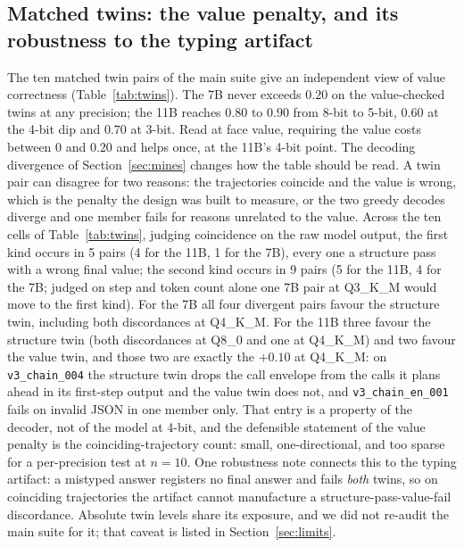 \documentclass[11pt]{article}
\begin{document}
\subsection{Matched twins: the value penalty, and its robustness to the typing artifact}
\label{sec:twins-results}
The ten matched twin pairs of the main suite give an independent view of value correctness (Table~\ref{tab:twins}). The 7B never exceeds $0.20$ on the value-checked twins at any precision; the 11B reaches $0.80$ to $0.90$ from 8-bit to 5-bit, $0.60$ at the 4-bit dip and $0.70$ at 3-bit. Read at face value, requiring the value costs between $0$ and $0.20$ and helps once, at the 11B's 4-bit point. The decoding divergence of Section~\ref{sec:mines} changes how the table should be read. A twin pair can disagree for two reasons: the trajectories coincide and the value is wrong, which is the penalty the design was built to measure, or the two greedy decodes diverge and one member fails for reasons unrelated to the value. Across the ten cells of Table~\ref{tab:twins}, judging coincidence on the raw model output, the first kind occurs in 5 pairs (4 for the 11B, 1 for the 7B), every one a structure pass with a wrong final value; the second kind occurs in 9 pairs (5 for the 11B, 4 for the 7B; judged on step and token count alone one 7B pair at Q3\_K\_M would move to the first kind). For the 7B all four divergent pairs favour the structure twin, including both discordances at Q4\_K\_M. For the 11B three favour the structure twin (both discordances at Q8\_0 and one at Q4\_K\_M) and two favour the value twin, and those two are exactly the $+0.10$ at Q4\_K\_M: on \texttt{v3\_chain\_004} the structure twin drops the call envelope from the calls it plans ahead in its first-step output and the value twin does not, and \texttt{v3\_chain\_en\_001} fails on invalid JSON in one member only. That entry is a property of the decoder, not of the model at 4-bit, and the defensible statement of the value penalty is the coinciding-trajectory count: small, one-directional, and too sparse for a per-precision test at $n=10$. One robustness note connects this to the typing artifact: a mistyped answer registers no final answer and fails \emph{both} twins, so on coinciding trajectories the artifact cannot manufacture a structure-pass-value-fail discordance. Absolute twin levels share its exposure, and we did not re-audit the main suite for it; that caveat is listed in Section~\ref{sec:limits}.
\end{document}
